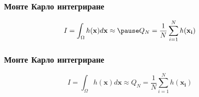 
\begin{frame}
  \frametitle{Монте Карло интегриране}
  \begin{equation*}
  I = \int_{\Omega} h(\mathbf{x}) d \mathbf{x} \approx
  \pause
  Q_N = \frac{1}{N} \sum_{i=1}^N h(\mathbf{x_i}) 
  \end{equation*}
\noindent
{}
\end{frame}

\begin{frame}
  \frametitle{Монте Карло интегриране}
  \addtocounter{framenumber}{-1}
  \begin{equation*}
  I = \int_{\Omega} h(\mathbf{x}) d \mathbf{x} \approx
  Q_N = \frac{1}{N} \sum_{i=1}^N h(\mathbf{x_i}) 
  \end{equation*}
\noindent
{}
\end{frame}
